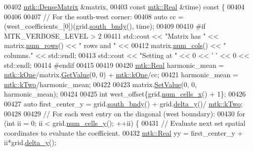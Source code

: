 \begin{DoxyCode}
00402     \hyperlink{classmtk_1_1DenseMatrix}{mtk::DenseMatrix} &matrix,
00403     \textcolor{keyword}{const} \hyperlink{group__c01-roots_gac080bbbf5cbb5502c9f00405f894857d}{mtk::Real} &time)\textcolor{keyword}{ const }\{
00404 
00406 
00407   \textcolor{comment}{// For the south-west corner:}
00408   \textcolor{keyword}{auto} cc = (west\_coefficients\_[0])(grid.\hyperlink{classmtk_1_1UniStgGrid2D_a1442eaf219f099d0ebf46a170fdebf92}{south\_bndy}(), time);
00409 
00410 \textcolor{preprocessor}{  #if MTK\_VERBOSE\_LEVEL > 2}
00411   std::cout << \textcolor{stringliteral}{"Matrix has "} << matrix.\hyperlink{classmtk_1_1DenseMatrix_a53f3afb3b6a8d21854458aaa9663cc74}{num\_rows}() << \textcolor{stringliteral}{" rows and "} <<
00412     matrix.\hyperlink{classmtk_1_1DenseMatrix_a41747502d468c6728a4be31501b16e0e}{num\_cols}() << \textcolor{stringliteral}{" columns."} << std::endl;
00413   std::cout << \textcolor{stringliteral}{"Setting at "} << 0 << \textcolor{charliteral}{' '} << 0 << std::endl;
00414 \textcolor{preprocessor}{  #endif}
00415 
00419 
00420   \hyperlink{group__c01-roots_gac080bbbf5cbb5502c9f00405f894857d}{mtk::Real} harmonic\_mean = \hyperlink{group__c01-roots_ga26407c24d43b6b95480943340d285c71}{mtk::kOne}/matrix.\hyperlink{classmtk_1_1DenseMatrix_a4b23ecbebd970b5eea915dbb50691024}{GetValue}(0, 0) + 
      \hyperlink{group__c01-roots_ga26407c24d43b6b95480943340d285c71}{mtk::kOne}/cc;
00421   harmonic\_mean = \hyperlink{group__c01-roots_gaf39c2d851a2db744f4feb1c5ab3ec2cf}{mtk::kTwo}/harmonic\_mean;
00422 
00423   matrix.\hyperlink{classmtk_1_1DenseMatrix_a784ce5784109ac86bfb9d8562b334b13}{SetValue}(0, 0, harmonic\_mean);
00424 
00425   \textcolor{keywordtype}{int} west\_offset\{grid.\hyperlink{classmtk_1_1UniStgGrid2D_a2d182866a398aba8e4829590e85bf939}{num\_cells\_x}() + 1\};
00426 
00427   \textcolor{keyword}{auto} first\_center\_y = grid.\hyperlink{classmtk_1_1UniStgGrid2D_a1442eaf219f099d0ebf46a170fdebf92}{south\_bndy}() + grid.\hyperlink{classmtk_1_1UniStgGrid2D_a65a78cfc80ffdbeb282ed57af4dc5cb4}{delta\_y}()/
      \hyperlink{group__c01-roots_gaf39c2d851a2db744f4feb1c5ab3ec2cf}{mtk::kTwo};
00428 
00429   \textcolor{comment}{// For each west entry on the diagonal (west boundary):}
00430   \textcolor{keywordflow}{for} (\textcolor{keywordtype}{int} ii = 0; ii < grid.\hyperlink{classmtk_1_1UniStgGrid2D_aed05a801cc9a76dba0ff203cea58a61a}{num\_cells\_y}(); ++ii) \{
00431     \textcolor{comment}{// Evaluate next set spatial coordinates to evaluate the coefficient.}
00432     \hyperlink{group__c01-roots_gac080bbbf5cbb5502c9f00405f894857d}{mtk::Real} yy = first\_center\_y + ii*grid.\hyperlink{classmtk_1_1UniStgGrid2D_a65a78cfc80ffdbeb282ed57af4dc5cb4}{delta\_y}();

\end{DoxyCode}
